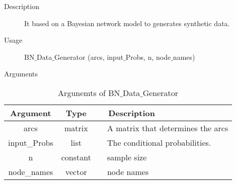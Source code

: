 \begin{description}
	\item[Description] It based on a Bayesian network model to generates synthetic data.
	
	\item[Usage] BN$\_$Data$\_$Generator (arcs, input$\_$Probs, n, node$\_$names)
	
	\item[Arguments]
\end{description}
	
\begin{table}[!h]
\centering	\caption{Argunemts of BN$\_$Data$\_$Generator}
{\tabcolsep=0.01in																										
	\begin{tabular}{c|c|l}
	\hline
	Argument & Type & ~~Description\tabularnewline
	\hline
	arcs & matrix & ~~A matrix that determines the arcs\tabularnewline
	input\_Probs & list & ~~The conditional probabilities.\tabularnewline
	n & constant & ~~sample size\tabularnewline
	node\_names & vector & ~~node names\tabularnewline
	\hline
	\end{tabular}
}																										
\end{table}